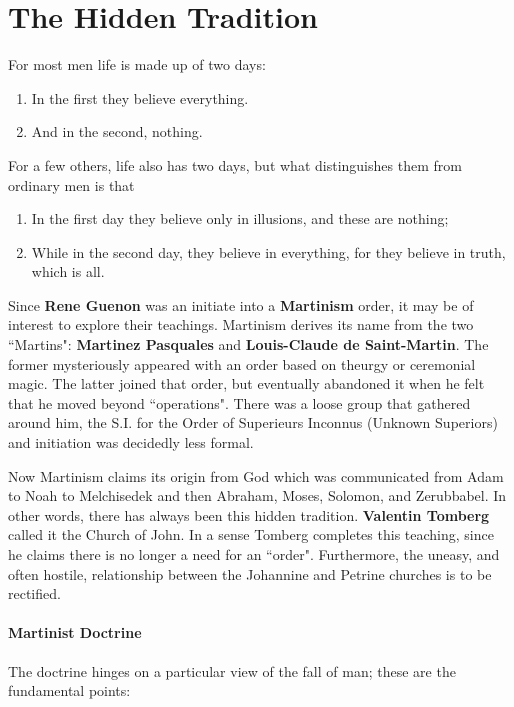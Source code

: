 \section{The Hidden Tradition}
\label{sec:HiddenTradition}

\begin{quotex}
For most men life is made up of two days:

\begin{enumerate}
\item 
In the first they believe everything. 
\item
And in the second, nothing. 
\end{enumerate}

For a few others, life also has two days, but what distinguishes them from ordinary men is that

\begin{enumerate}
\item
In the first day they believe only in illusions, and these are nothing; 
\item
While in the second day, they believe in everything, for they believe in truth, which is all. 
\end{enumerate}

\end{quotex}
Since \textbf{Rene Guenon} was an initiate into a \textbf{Martinism} order, it may be of interest to explore their teachings. Martinism derives its name from the two ``Martins": \textbf{Martinez Pasquales} and \textbf{Louis-Claude de Saint-Martin}. The former mysteriously appeared with an order based on theurgy or ceremonial magic. The latter joined that order, but eventually abandoned it when he felt that he moved beyond ``operations". There was a loose group that gathered around him, the S.I. for the Order of Superieurs Inconnus (Unknown Superiors) and initiation was decidedly less formal.

Now Martinism claims its origin from God which was communicated from Adam to Noah to Melchisedek and then Abraham, Moses, Solomon, and Zerubbabel. In other words, there has always been this hidden tradition. \textbf{Valentin Tomberg} called it the Church of John. In a sense Tomberg completes this teaching, since he claims there is no longer a need for an ``order". Furthermore, the uneasy, and often hostile, relationship between the Johannine and Petrine churches is to be rectified.

\paragraph{Martinist Doctrine}
The doctrine hinges on a particular view of the fall of man; these are the fundamental points:

